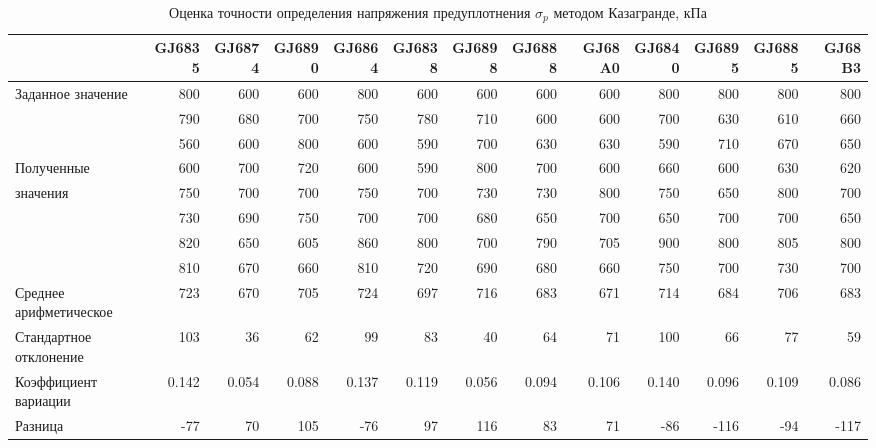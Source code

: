 \begin{sidewaystable}[p]
    \centering
    \small
    \caption{Оценка точности определения напряжения предуплотнения $\sigma_p$ методом Казагранде, кПа} \label{tab:accuracy-caz}
    \begin{tabular}{@{}lrrrrrrrrrrrr@{}}
    \toprule
     & GJ6835 & GJ6874 & GJ6890 & GJ6864 & GJ6838 & GJ6898 & GJ6888 & GJ68A0 & GJ6840 & GJ6895 & GJ6885 & GJ68B3 \\
    \midrule
    Заданное значение & 800 & 600 & 600 & 800 & 600 & 600 & 600 & 600 & 800 & 800 & 800 & 800 \\
    \midrule
     & 790 & 680 & 700 & 750 & 780 & 710 & 600 & 600 & 700 & 630 & 610 & 660 \\
     & 560 & 600 & 800 & 600 & 590 & 700 & 630 & 630 & 590 & 710 & 670 & 650 \\
    Полученные & 600 & 700 & 720 & 600 & 590 & 800 & 700 & 600 & 660 & 600 & 630 & 620 \\
    значения & 750 & 700 & 700 & 750 & 700 & 730 & 730 & 800 & 750 & 650 & 800 & 700 \\
     & 730 & 690 & 750 & 700 & 700 & 680 & 650 & 700 & 650 & 700 & 700 & 650 \\
     & 820 & 650 & 605 & 860 & 800 & 700 & 790 & 705 & 900 & 800 & 805 & 800 \\
     & 810 & 670 & 660 & 810 & 720 & 690 & 680 & 660 & 750 & 700 & 730 & 700 \\
    \midrule
    Среднее арифметическое & 723 & 670 & 705 & 724 & 697 & 716 & 683 & 671 & 714 & 684 & 706 & 683 \\
    Стандартное отклонение & 103 & 36 & 62 & 99 & 83 & 40 & 64 & 71 & 100 & 66 & 77 & 59 \\
    Коэффициент вариации & 0.142 & 0.054 & 0.088 & 0.137 & 0.119 & 0.056 & 0.094 & 0.106 & 0.140 & 0.096 & 0.109 & 0.086 \\
    \midrule
    Разница & -77 & 70 & 105 & -76 & 97 & 116 & 83 & 71 & -86 & -116 & -94 & -117 \\
    \bottomrule
    \end{tabular}
    \\ 
\end{sidewaystable}


